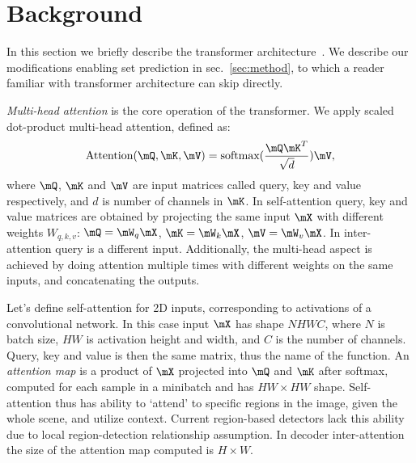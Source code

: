 \section{Background}
\label{sec:background}

In this section we briefly describe the transformer architecture~\cite{Vaswani2017AttentionIA}.
We describe our modifications enabling set prediction in sec.~\ref{sec:method}, to which a reader familiar with
transformer architecture can skip directly.

\textit{Multi-head attention} is the core operation of the transformer.
We apply scaled dot-product multi-head attention, defined as:
\[\text{Attention}(\mQ, \mK, \mV) = \text{softmax}(\frac{\mQ\mK^T}{\sqrt{d}})\mV,\]
where $\mQ$, $\mK$ and $\mV$ are input matrices called query, key and value respectively,
and $d$ is number of channels in $\mK$.
In self-attention query, key and value matrices are obtained by projecting
the same input $\mX$ with different weights $W_{q,k,v}$:
$\mQ = \mW_q\mX$, $\mK = \mW_k\mX$, $\mV = \mW_v\mX$.
In inter-attention query is a different input.
Additionally, the multi-head aspect is achieved by doing attention multiple times with different weights on the same
inputs, and concatenating the outputs.

Let's define self-attention for 2D inputs, corresponding to activations of a convolutional network.
In this case input $\mX$ has shape $NHWC$, where $N$ is batch size,
$HW$ is activation height and width, and $C$ is the number of channels.
Query, key and value is then the same matrix, thus the name of the function.
An \textit{attention map} is a product of $\mX$ projected into $\mQ$ and $\mK$ after softmax,
computed for each sample in a minibatch and has $HW\times HW$ shape.
Self-attention thus has ability to `attend' to specific regions in the image, given the whole scene,
and utilize context.
Current region-based detectors lack this ability due to local region-detection relationship assumption.
In decoder inter-attention the size of the attention map computed is $H\times W$.

